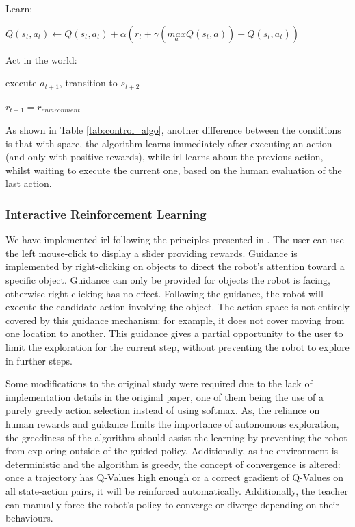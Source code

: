 \begin{table}
\begin{minipage}[t]{0.5\textwidth}
\begin{algorithm}[H]
\begin{minipage}{0.9\linewidth}
{		\nosemic Learn:
		 
		\pushline\dosemic$Q(s_{t},a_{t}) \leftarrow Q(s_{t},a_{t}) + \alpha (r_{t}+\gamma (\underset{a}{max} Q(s_{t},a))-Q(s_{t},a_{t}))$
		
		\popline \nosemic Act in the world:
		
		\pushline\dosemic execute $a_{t+1}$, transition to $s_{t+2}$
		
		\popline$r_{t+1} = r_{environment}$
	}
	\end{minipage}
	\end{algorithm}
\end{minipage}
\label{tab:control_algo}
\end{table}

As shown in Table \ref{tab:control_algo}, another difference between the conditions is that with \gls{sparc}, the algorithm learns immediately after executing an action (and only with positive rewards), while \gls{irl} learns about the previous action, whilst waiting to execute the current one, based on the human evaluation of the last action.

\subsubsection{Interactive Reinforcement Learning}

We have implemented \gls{irl} following the principles presented in \cite{thomaz2008teachable}. The user can use the left mouse-click to display a slider providing rewards. Guidance is implemented by right-clicking on objects to direct the robot's attention toward a specific object. Guidance can only be provided for objects the robot is facing, otherwise right-clicking has no effect. Following the guidance, the robot will execute the candidate action involving the object. The action space is not entirely covered by this guidance mechanism: for example, it does not cover moving from one location to another. This guidance gives a partial opportunity to the user to limit the exploration for the current step, without preventing the robot to explore in further steps.

Some modifications to the original study were required due to the lack of implementation details in the original paper, one of them being the use of a purely greedy action selection instead of using softmax. As, the reliance on human rewards and guidance limits the importance of autonomous exploration, the greediness of the algorithm should assist the learning by preventing the robot from exploring outside of the guided policy. Additionally, as the environment is deterministic and the algorithm is greedy, the concept of convergence is altered: once a trajectory has Q-Values high enough or a correct gradient of Q-Values on all state-action pairs, it will be reinforced automatically. Additionally, the teacher can manually force the robot's policy to converge or diverge depending on their behaviours.


